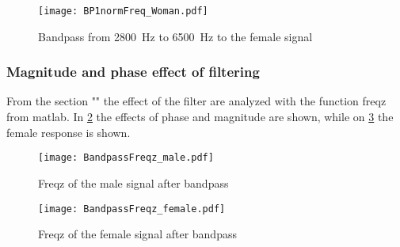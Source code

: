 \begin{figure}[h]
\centering
\texttt{[image: BP1normFreq\_Woman.pdf]}
\caption{Bandpass from \SI{2800}{\hertz} to \SI{6500}{\hertz} to the female signal}
\label{fig:femaleBP}
\end{figure}


\subsubsection{Magnitude and phase effect of filtering}

From the section "" the effect of the filter are analyzed with the function freqz from matlab. In \cref{fig:freqzMaleBP} the effects of phase and magnitude are shown, while on \cref{fig:freqzFemaleBP} the female response is shown. 

\begin{figure}
\centering
\texttt{[image: BandpassFreqz\_male.pdf]}
\caption{Freqz of the male signal after bandpass}
\label{fig:freqzMaleBP}
\end{figure}

\begin{figure}
\centering
\texttt{[image: BandpassFreqz\_female.pdf]}
\caption{Freqz of the female signal after bandpass}
\label{fig:freqzFemaleBP}
\end{figure}